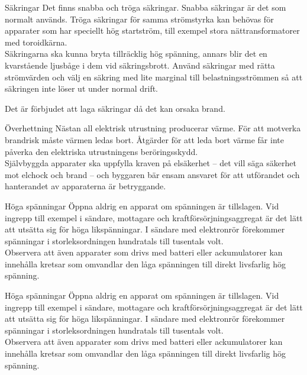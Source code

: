 \documentclass{beamer}
\begin{document}
\begin{frame}{Säkringar}
Det finns snabba och tröga säkringar.
Snabba säkringar är det som normalt används.
Tröga säkringar för samma strömstyrka kan behövas för apparater som har
speciellt hög startström, till exempel stora nättransformatorer med toroidkärna.\\
\vspace{2mm}
Säkringarna ska kunna bryta tillräcklig hög spänning, annars blir det
en kvarstående ljusbåge i dem vid säkringsbrott.
Använd säkringar med rätta strömvärden och välj en säkring med lite marginal
till belastningsströmmen så att säkringen inte löser ut under normal drift.

Det är förbjudet att laga säkringar då det kan orsaka brand.

\end{frame}
\begin{frame}{Överhettning}
Nästan all elektrisk utrustning producerar värme.
För att motverka brandrisk måste värmen ledas bort.
Åtgärder för att leda bort värme får inte påverka den elektriska utrustningens
beröringsskydd.\\
\vspace{2mm}
Självbyggda apparater ska uppfylla kraven på elsäkerhet -- det vill säga
säkerhet mot elchock och brand -- och byggaren bär ensam ansvaret för att
utförandet och hanterandet av apparaterna är betryggande.
\end{frame}

\begin{frame}{Höga spänningar}
Öppna aldrig en apparat om spänningen är tillslagen.
Vid ingrepp till exempel i sändare, mottagare och kraftförsörjningsaggregat är
det lätt att utsätta sig för höga likspänningar.
I sändare med elektronrör förekommer spänningar i storleksordningen hundratals
till tusentals volt.\\
\vspace{2mm}
Observera att även apparater som drivs med batteri eller ackumulatorer kan
innehålla kretsar som omvandlar den låga spänningen till direkt livsfarlig hög
spänning.
\end{frame}
\begin{frame}{Höga spänningar}
Öppna aldrig en apparat om spänningen är tillslagen.
Vid ingrepp till exempel i sändare, mottagare och kraftförsörjningsaggregat är
det lätt att utsätta sig för höga likspänningar.
I sändare med elektronrör förekommer spänningar i storleksordningen hundratals
till tusentals volt.\\
\vspace{2mm}
Observera att även apparater som drivs med batteri eller ackumulatorer kan
innehålla kretsar som omvandlar den låga spänningen till direkt livsfarlig hög
spänning.
\end{frame}
\end{document}
